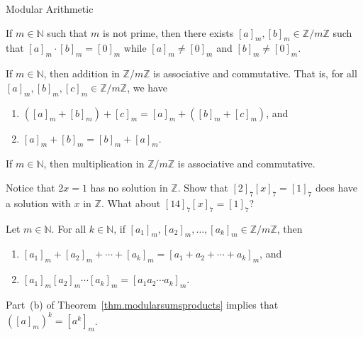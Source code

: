 \begin{section}{Modular Arithmetic}
\begin{theorem}
If $m\in \mathbb{N}$ such that $m$ is not prime, then there exists $[a]_m, [b]_m \in \mathbb{Z}/m\mathbb{Z}$ such that $[a]_m\cdot[b]_m = [0]_m$ while $[a]_m \neq [0]_m$ and $[b]_m \neq [0]_m$.
\end{theorem}

\begin{theorem}
If $m\in \mathbb{N}$, then addition in $\mathbb{Z}/m\mathbb{Z}$ is associative and commutative. That is, for all $[a]_m, [b]_m, [c]_m \in \mathbb{Z}/m\mathbb{Z}$, we have
\begin{enumerate}[label=\textrm{(\alph*)}]
\item $([a]_m + [b]_m) + [c]_m = [a]_m + ([b]_m + [c]_m)$, and 
\item $[a]_m + [b]_m = [b]_m + [a]_m$.
\end{enumerate}
\end{theorem}

\begin{theorem}
If $m\in \mathbb{N}$, then multiplication in $\mathbb{Z}/m\mathbb{Z}$ is associative and commutative.
\end{theorem}

\begin{exercise}
Notice that $2x = 1$ has no solution in $\mathbb{Z}$. Show that  $[2]_7[x]_7 = [1]_7$ does have a solution with $x$ in $\mathbb{Z}$. What about $[14]_7[x]_7 = [1]_7$?
\end{exercise}

\begin{theorem}\label{thm.modularsumsproducts}
Let $m\in \mathbb{N}$.  For all $k\in \mathbb{N}$, if $[a_1]_m,[a_2]_m,\ldots, [a_k]_m \in \mathbb{Z}/m\mathbb{Z}$, then 
\begin{enumerate}[label=\textrm{(\alph*)}]
\item $[a_1]_m+[a_2]_m+\cdots+ [a_k]_m = [a_1 + a_2 +\cdots+ a_k]_m$, and
\item $[a_1]_m [a_2]_m \cdots  [a_k]_m = [a_1 a_2 \cdots a_k]_m$.
\end{enumerate}
\end{theorem}

\begin{remark}\label{rmk.modularpower}
Part~(b) of Theorem~\ref{thm.modularsumsproducts} implies that $([a]_m)^k = [a^k]_m$.
\end{remark}


\end{section}
